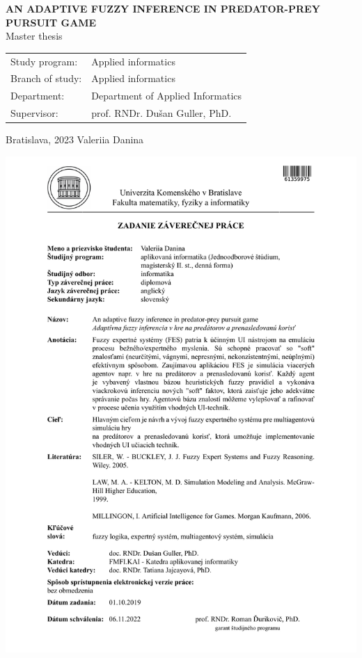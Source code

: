 \documentclass[12pt, twoside, openany]{book}
\def\mftitle{An adaptive fuzzy inference in predator-prey pursuit game}
\def\mfthesistype{Master thesis}
\def\mfauthor{Valeriia Danina}
\def\mfskolitel{prof. RNDr. Dušan Guller, PhD.}
\def\mfplacedate{Bratislava, 2023}
\def\mfodbor{Applied informatics}
\def\program{Applied informatics}
\def\mfpracovisko{Department of Applied Informatics }
\begin{document}
\begin{center}
	\textbf{\MakeUppercase{\Large\mftitle}}\\
	\mfthesistype
\end{center}
\vfill


\begin{tabular}{l l}
Study program: & \program \\
Branch of study: & \mfodbor \\
Department: & \mfpracovisko \\
Supervisor: & \mfskolitel \\
\end{tabular}

\vfill
\noindent
\mfplacedate \hfill
\mfauthor
\cleardoublepage

\newpage 
\thispagestyle{empty}
\hspace{-2cm}\includegraphics[page=1,width=1.1\textwidth]{zadaniePrace.PDF}
\end{document}
